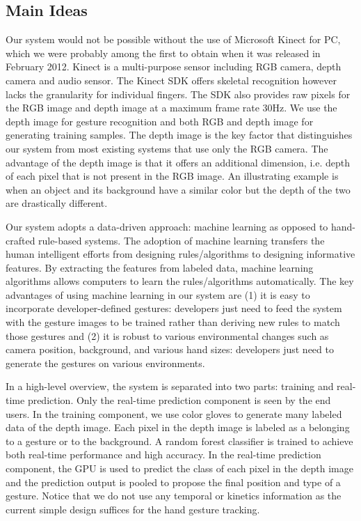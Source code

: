 \subsection{Main Ideas}
Our system would not be possible without the use of Microsoft Kinect for PC, which we were probably among the first to obtain when it was released in February 2012. Kinect is a multi-purpose sensor including RGB camera, depth camera and audio sensor. The Kinect SDK offers skeletal recognition however lacks the granularity for individual fingers. The SDK also provides raw pixels for the RGB image and depth image at a maximum frame rate 30Hz. We use the depth image for gesture recognition and both RGB and depth image for generating training samples. The depth image is the key factor that distinguishes our system from most existing systems that use only the RGB camera. The advantage of the depth image is that it offers an additional dimension, i.e. depth of each pixel that is not present in the RGB image. An illustrating example is when an object and its background have a similar color but the depth of the two are drastically different.

Our system adopts a data-driven approach: machine learning as opposed to hand-crafted rule-based systems. The adoption of machine learning transfers the human intelligent efforts from designing rules/algorithms to designing informative features. By extracting the features from labeled data, machine learning algorithms allows computers to learn the rules/algorithms automatically. The key advantages of using machine learning in our system    
are (1) it is easy to incorporate developer-defined gestures: developers just need to feed the system with the gesture images to be trained rather than deriving new rules to match those gestures and (2) it is robust to various environmental changes such as camera position, background, and various hand sizes: developers just need to generate the gestures on various environments. 

In a high-level overview, the system is separated into two parts: training and real-time prediction. Only the real-time prediction component is seen by the end users. In the training component, we use color gloves to generate many labeled data of the depth image. Each pixel in the depth image is labeled as a belonging to a gesture or to the background. A random forest classifier is trained to achieve both real-time performance and high accuracy. In the real-time prediction component, the GPU is used to predict the class of each pixel in the depth image and the prediction output is pooled to propose the final position and type of a gesture. Notice that we do not use any temporal or kinetics information as the current simple design suffices for the hand gesture tracking.

